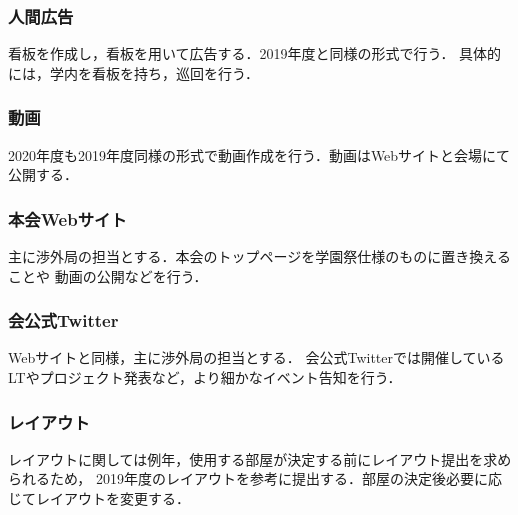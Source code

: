\subsubsection*{人間広告}
看板を作成し，看板を用いて広告する．2019年度と同様の形式で行う．
具体的には，学内を看板を持ち，巡回を行う．

\subsubsection*{動画}
2020年度も2019年度同様の形式で動画作成を行う．動画はWebサイトと会場にて公開する．


\subsubsection*{本会Webサイト}
主に渉外局の担当とする．本会のトップページを学園祭仕様のものに置き換えることや
動画の公開などを行う．

\subsubsection*{会公式Twitter}
Webサイトと同様，主に渉外局の担当とする．
会公式Twitterでは開催しているLTやプロジェクト発表など，より細かなイベント告知を行う．

\subsubsection*{レイアウト}
レイアウトに関しては例年，使用する部屋が決定する前にレイアウト提出を求められるため，
2019年度のレイアウトを参考に提出する．部屋の決定後必要に応じてレイアウトを変更する．

